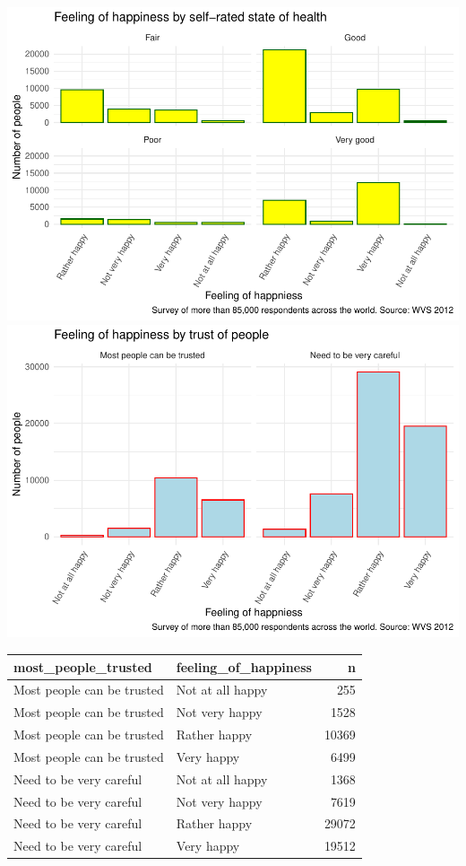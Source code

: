 \documentclass[man]{apa6}
\begin{document}
\includegraphics{610_final_files/figure-latex/trust and health-1.pdf}
\includegraphics{610_final_files/figure-latex/trust and health-2.pdf}

\begin{tabular}{l|l|r}
\hline
most\_people\_trusted & feeling\_of\_happiness & n\\
\hline
Most people can be trusted & Not at all happy & 255\\
\hline
Most people can be trusted & Not very happy & 1528\\
\hline
Most people can be trusted & Rather happy & 10369\\
\hline
Most people can be trusted & Very happy & 6499\\
\hline
Need to be very careful & Not at all happy & 1368\\
\hline
Need to be very careful & Not very happy & 7619\\
\hline
Need to be very careful & Rather happy & 29072\\
\hline
Need to be very careful & Very happy & 19512\\
\hline
\end{tabular}
\end{document}
